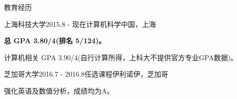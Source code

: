 \documentclass{resume} %
\begin{document}

\begin{rSection}{教育经历}

\begin{rSubsection}
  {上海科技大学}{2015.8 - 现在}{计算机科学}{中国，上海}
    \item \textbf{总 GPA 3.80/4(排名 5/124)。}
    \item 计算机相关 GPA 3.90/4(自行计算所得，上科大不提供官方专业GPA数据)。
\end{rSubsection}


\begin{rSubsection}
  {芝加哥大学}{2016.7 - 2016.8}{任选课程}{伊利诺伊，芝加哥}
    \item 强化英语及数值分析，成绩均为A。
\end{rSubsection}

\end{rSection}
\end{document}
